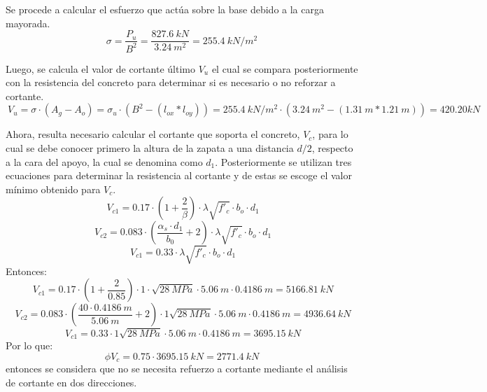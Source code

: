 \documentclass[12pt]{article}
\begin{document}
Se procede a calcular el esfuerzo que actúa sobre la base debido a la carga mayorada.
\begin{equation*}
    \sigma=\frac{P_{u}}{B^2} =\frac{827.6~kN}{3.24~m^2}=255.4~kN/m^2
\end{equation*}

Luego, se calcula el valor de cortante último $V_{u}$ el cual se compara posteriormente con la resistencia del concreto para determinar si es necesario o no reforzar a cortante.
\begin{equation*}
    \ V_{u}=\sigma \cdot(A_{g}-A_{o})= \sigma_{u} \cdot(B^2-(l_{ox}*l_{oy})) = 255.4~kN/m^2\cdot(3.24~m^2-(1.31~m*1.21~m))=420.20 kN
\end{equation*}

Ahora, resulta necesario calcular el cortante que soporta el concreto, $V_{c}$, para lo cual se debe conocer primero la altura de la zapata a una distancia $d/2$, respecto a la cara del apoyo, la cual se denomina como $d_{1}$. Posteriormente se utilizan tres ecuaciones para determinar la resistencia al cortante y de estas se escoge el valor mínimo obtenido para $V_{c}$.
\begin{equation*}
    \ V_{c1}=0.17\cdot \left(1+\frac{2}{\beta} \right)\cdot\lambda\sqrt{f'_{c}}\cdot b_{o} \cdot d_{1}
\end{equation*}
\begin{equation*}
    \ V_{c2}=0.083\cdot \left(\frac{\alpha_{s}\cdot d_{1}}{b_{0}}+2 \right)\cdot\lambda\sqrt{f'_{c}}\cdot b_{o} \cdot d_{1}
\end{equation*}
\begin{equation*}
    \ V_{c1}=0.33\cdot\lambda\sqrt{f'_{c}}\cdot b_{o} \cdot d_{1}
\end{equation*}
Entonces:
\begin{equation*}
    \ V_{c1}=0.17\cdot \left(1+\frac{2}{0.85} \right)\cdot 1 \cdot \sqrt{28~MPa}\cdot 5.06~m \cdot 0.4186~m=5166.81~kN
\end{equation*}
\begin{equation*}
    \ V_{c2}=0.083\cdot \left(\frac{40 \cdot 0.4186~m}{5.06~m}+2 \right)\cdot 1 \sqrt{28~MPa}\cdot 5.06~m \cdot 0.4186~m=4936.64~kN
\end{equation*}
\begin{equation*}
    \ V_{c1}=0.33\cdot1 \sqrt{28~MPa}\cdot 5.06~m \cdot 0.4186~m=3695.15~kN
\end{equation*}
Por lo que:
\begin{equation*}
    \phi V_{c}=0.75\cdot3695.15~kN=2771.4~kN
\end{equation*}
entonces se considera que no se necesita refuerzo a cortante mediante el análisis de cortante en dos direcciones.

\end{document}
